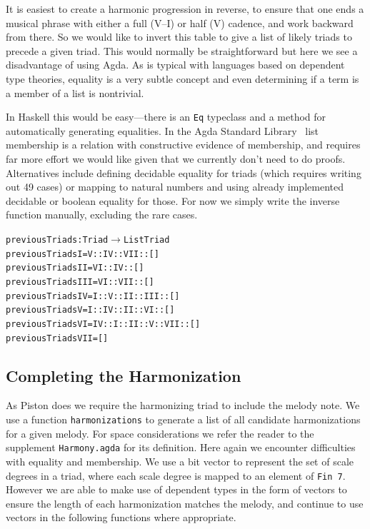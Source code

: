 It is easiest to create a harmonic progression in reverse, to
ensure that one ends a musical phrase with either a full (V--I) or half (V)
cadence, and work backward from there. So we would like to invert this
table to give a list of likely triads to precede a given triad. This
would normally be straightforward but here we see a disadvantage of
using Agda. As is typical with languages based on dependent type
theories, equality is a very subtle concept and even determining if a
term is a member of a list is nontrivial.

In Haskell this would be easy---there is an \texttt{Eq} typeclass and a
method for automatically generating equalities. In the Agda Standard
Library~\citep{agda-stdlib} list membership is a relation with
constructive evidence of membership, and requires far more effort we
would like given that we currently don't need to do
proofs. Alternatives include defining decidable equality for triads
(which requires writing out 49 cases) or mapping to natural numbers
and using already implemented decidable or boolean equality for
those. For now we simply write the inverse function manually,
excluding the rare cases.

\begin{alltt}
previousTriads : Triad \(\rightarrow\) List Triad
previousTriads I   = V :: IV :: VII :: []
previousTriads II  = VI :: IV :: []
previousTriads III = VI :: VII :: []
previousTriads IV  = I :: V :: II :: III :: []
previousTriads V   = I :: IV :: II :: VI :: []
previousTriads VI  = IV :: I :: II :: V :: VII :: []
previousTriads VII = []
\end{alltt}

\subsection{Completing the Harmonization}
\label{sec:harmony:complete}

As Piston does we require the harmonizing triad to include the melody
note. We use a function \texttt{harmonizations} to generate a list of
all candidate harmonizations for a given melody. For space
considerations we refer the reader to the supplement
\texttt{Harmony.agda} for its definition. Here again we encounter difficulties
with equality and membership. We use a bit vector to represent the
set of scale degrees in a triad, where each scale degree is mapped to
an element of \texttt{Fin 7}. However we are able to make use of
dependent types in the form of vectors to ensure the length of each
harmonization matches the melody, and continue to use vectors in the
following functions where appropriate.

